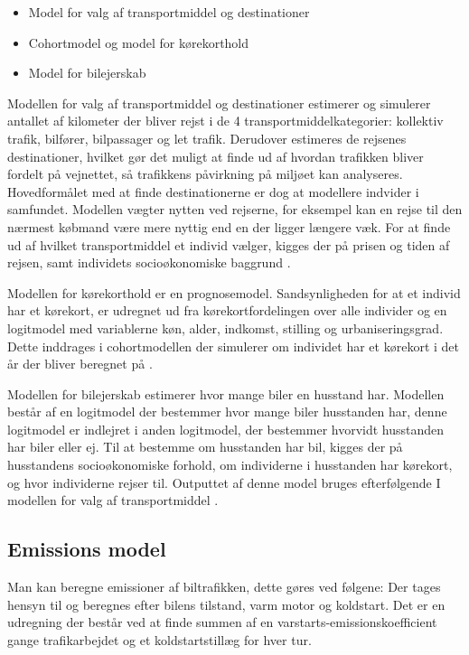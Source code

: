 \begin{itemize}
\item Model for valg af transportmiddel og destinationer
\item Cohortmodel og model for kørekorthold
\item Model for bilejerskab
\end{itemize}

Modellen for valg af transportmiddel og destinationer estimerer og simulerer antallet af kilometer der bliver rejst i de 4 transportmiddelkategorier: kollektiv trafik, bilfører, bilpassager og let trafik. Derudover estimeres de rejsenes destinationer, hvilket gør det muligt at finde ud af hvordan trafikken bliver fordelt på vejnettet, så trafikkens påvirkning på miljøet kan analyseres. Hovedformålet med at finde destinationerne er dog at modellere indvider i samfundet. Modellen vægter nytten ved rejserne, for eksempel kan en rejse til den nærmest købmand være mere nyttig end en der ligger længere væk. For at finde ud af hvilket transportmiddel et individ vælger, kigges der på prisen og tiden af rejsen, samt individets socioøkonomiske baggrund \cite[s. 26-27]{dmumodelanalyser}.

\vspace{5mm}

Modellen for kørekorthold er en prognosemodel. Sandsynligheden for at et individ har et kørekort, er udregnet ud fra kørekortfordelingen over alle individer og en logitmodel med variablerne køn, alder, indkomst, stilling og urbaniseringsgrad. Dette inddrages i cohortmodellen der simulerer om individet har et kørekort i det år der bliver beregnet på \cite[s. 30]{dmumodelanalyser}.

\vspace{5mm}

Modellen for bilejerskab estimerer hvor mange biler en husstand har. Modellen består af en logitmodel der bestemmer hvor mange biler husstanden har, denne logitmodel er indlejret i anden logitmodel, der bestemmer hvorvidt husstanden har biler eller ej. Til at bestemme om husstanden har bil, kigges der på husstandens socioøkonomiske forhold, om individerne i husstanden har kørekort, og hvor individerne rejser til. Outputtet af denne model bruges efterfølgende I modellen for valg af transportmiddel \cite[s. 29-30]{dmumodelanalyser}.

\subsection{Emissions model}
Man kan beregne emissioner af biltrafikken, dette gøres ved følgene: Der tages hensyn til og beregnes efter bilens tilstand, varm motor og koldstart. Det er en udregning der består ved at finde summen af en varstarts-emissionskoefficient gange trafikarbejdet og et koldstartstillæg for hver tur.

